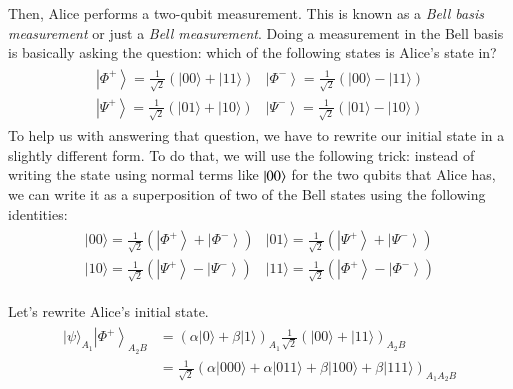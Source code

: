 Then, Alice performs a two-qubit measurement. This is known as a \emph{Bell basis measurement} or just a \emph{Bell measurement}.
Doing a measurement in the Bell basis is basically asking the question: which of the following states is Alice's state in? 
\begin{align}
    \begin{array}{ll}
\left|\Phi^{+}\right\rangle=\frac{1}{\sqrt{2}}(|00\rangle+|11\rangle) & \left|\Phi^{-}\right\rangle=\frac{1}{\sqrt{2}}(|00\rangle-|11\rangle) \\
\left|\Psi^{+}\right\rangle=\frac{1}{\sqrt{2}}(|01\rangle+|10\rangle) & \left|\Psi^{-}\right\rangle=\frac{1}{\sqrt{2}}(|01\rangle-|10\rangle)
\end{array}
\end{align}
To help us with answering that question, we have to rewrite our initial state in a slightly different form. To do that, we will use the following trick: instead of writing the state using normal terms like $\left| 00 \right\rangle$ for the two qubits that Alice has, we can write it as a superposition of two of the Bell states using the following identities:
\begin{align}
    \begin{array}{ll}
|00\rangle=\frac{1}{\sqrt{2}}\left(\left|\Phi^{+}\right\rangle+\left|\Phi^{-}\right\rangle\right) & |01\rangle=\frac{1}{\sqrt{2}}\left(\left|\Psi^{+}\right\rangle+\left|\Psi^{-}\right\rangle\right) \\
|10\rangle=\frac{1}{\sqrt{2}}\left(\left|\Psi^{+}\right\rangle-\left|\Psi^{-}\right\rangle\right) & |11\rangle=\frac{1}{\sqrt{2}}\left(\left|\Phi^{+}\right\rangle-\left|\Phi^{-}\right\rangle\right)
\end{array}
\end{align}

Let's rewrite Alice's initial state. %
\begin{align}
    \begin{aligned}
|\psi\rangle_{A_{1}}\left|\Phi^{+}\right\rangle_{A_{2} B} &=(\alpha|0\rangle+\beta|1\rangle)_{A_{1}} \frac{1}{\sqrt{2}}(|00\rangle+|11\rangle)_{A_{2} B} \\
&=\frac{1}{\sqrt{2}}(\alpha|000\rangle+\alpha|011\rangle+\beta|100\rangle+\beta|111\rangle)_{A_{1} A_{2} B}
\end{aligned}
\end{align}

